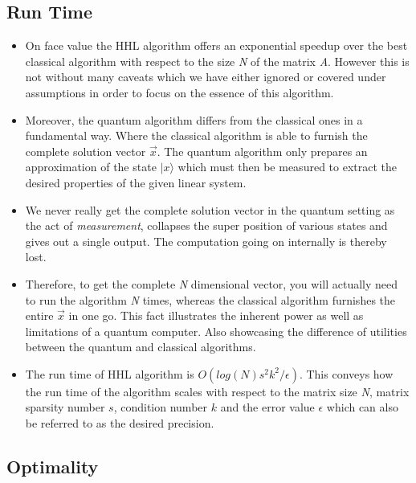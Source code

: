 \documentclass[12pt]{article}
\begin{document}
\subsection{Run Time}
\begin{itemize}
    \item On face value the HHL algorithm offers an exponential speedup over the best classical algorithm with respect to the size \emph{N} of the matrix \emph{A}. However this is not without many caveats which we have either ignored or covered under assumptions in order to focus on the essence of this algorithm.
    \item Moreover, the quantum algorithm differs from the classical ones in a fundamental way. Where the classical algorithm is able to furnish the complete solution vector $\vec x$. The quantum algorithm only prepares an approximation of the state $|x\rangle$ which must then be measured to extract the desired properties of the given linear system.
    \item We never really get the complete solution vector in the quantum setting as the act of \emph{measurement}, collapses the super position of various states and gives out a single output. The computation going on internally is thereby lost.
    \item Therefore, to get the complete \emph{N} dimensional vector, you will actually need to run the algorithm \emph{N} times, whereas the classical algorithm furnishes the entire $\vec x$ in one go. This fact illustrates the inherent power as well as limitations of a quantum computer. Also showcasing the difference of utilities between the quantum and classical algorithms. 
    \item The run time of HHL algorithm is $O(log(N)s^2k^2/\epsilon)$. This conveys how the run time of the algorithm scales with respect to the matrix size \emph{N}, matrix sparsity number $s$, condition number $k$ and the error value $\epsilon$ which can also be referred to as the desired precision.
    
\end{itemize}

\subsection{Optimality}
\end{document}
